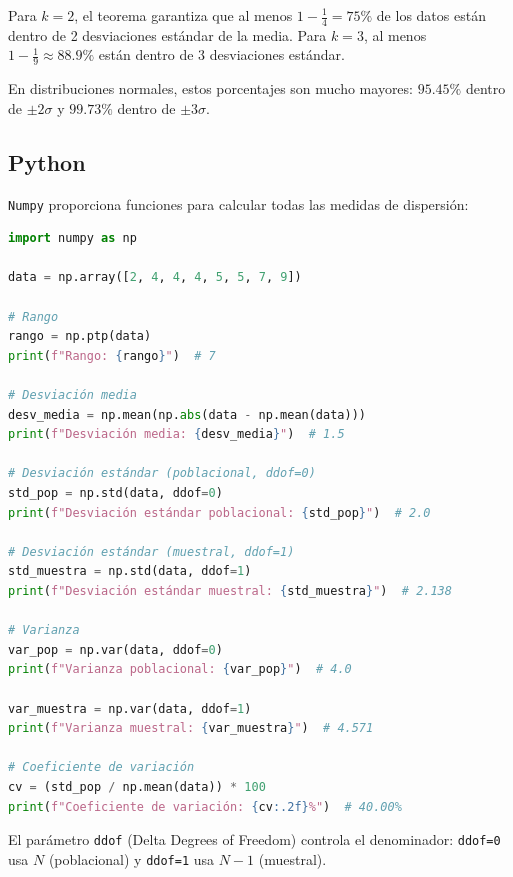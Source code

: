 \begin{observacion}
	Para $k=2$, el teorema garantiza que al menos $1 - \frac{1}{4} = 75\%$ de los datos están dentro de 2 desviaciones estándar de la media. Para $k=3$, al menos $1 - \frac{1}{9} \approx 88.9\%$ están dentro de 3 desviaciones estándar.
	
	En distribuciones normales, estos porcentajes son mucho mayores: $95.45\%$ dentro de $\pm 2\sigma$ y $99.73\%$ dentro de $\pm 3\sigma$.
\end{observacion}


\subsection{Python}

\texttt{Numpy} proporciona funciones para calcular todas las medidas de dispersión:

\begin{lstlisting}[language=Python]
import numpy as np

data = np.array([2, 4, 4, 4, 5, 5, 7, 9])

# Rango
rango = np.ptp(data)
print(f"Rango: {rango}")  # 7

# Desviación media
desv_media = np.mean(np.abs(data - np.mean(data)))
print(f"Desviación media: {desv_media}")  # 1.5

# Desviación estándar (poblacional, ddof=0)
std_pop = np.std(data, ddof=0)
print(f"Desviación estándar poblacional: {std_pop}")  # 2.0

# Desviación estándar (muestral, ddof=1)
std_muestra = np.std(data, ddof=1)
print(f"Desviación estándar muestral: {std_muestra}")  # 2.138

# Varianza
var_pop = np.var(data, ddof=0)
print(f"Varianza poblacional: {var_pop}")  # 4.0

var_muestra = np.var(data, ddof=1)
print(f"Varianza muestral: {var_muestra}")  # 4.571

# Coeficiente de variación
cv = (std_pop / np.mean(data)) * 100
print(f"Coeficiente de variación: {cv:.2f}%")  # 40.00%
\end{lstlisting}

\begin{observacion}
	El parámetro \texttt{ddof} (Delta Degrees of Freedom) controla el denominador: \texttt{ddof=0} usa $N$ (poblacional) y \texttt{ddof=1} usa $N-1$ (muestral).
\end{observacion}
